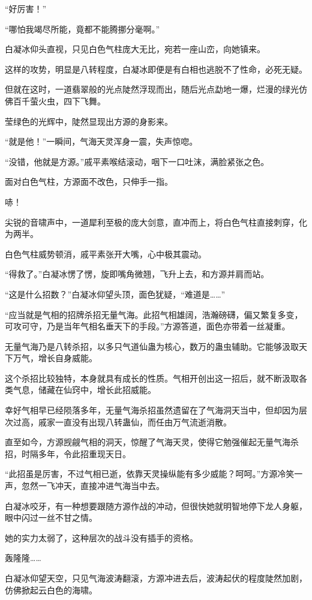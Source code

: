 \begin{this_body}
“好厉害！”

“哪怕我竭尽所能，竟都不能腾挪分毫啊。”

白凝冰仰头直视，只见白色气柱庞大无比，宛若一座山峦，向她镇来。

这样的攻势，明显是八转程度，白凝冰即便是有白相也逃脱不了性命，必死无疑。

但就在这时，一道翡翠般的光点陡然浮现而出，随后光点勐地一爆，烂漫的绿光仿佛百千萤火虫，四下飞舞。

莹绿色的光辉中，陡然显现出方源的身影来。

“就是他！”一瞬间，气海天灵浑身一震，失声惊唿。

“没错，他就是方源。”戚平素喉结滚动，咽下一口吐沫，满脸紧张之色。

面对白色气柱，方源面不改色，只伸手一指。

哧！

尖锐的音啸声中，一道犀利至极的庞大剑意，直冲而上，将白色气柱直接刺穿，化为两半。

白色气柱威势顿消，戚平素张开大嘴，心中极其震动。

“得救了。”白凝冰愣了愣，旋即嘴角微翘，飞升上去，和方源并肩而站。

“这是什么招数？”白凝冰仰望头顶，面色犹疑，“难道是……”

“应当就是气相的招牌杀招无量气海。此招气相雄阔，浩瀚磅礴，偏又繁复多变，可攻可守，乃是当年气相名垂天下的手段。”方源答道，面色亦带着一丝凝重。

无量气海乃是八转杀招，以多只气道仙蛊为核心，数万的蛊虫辅助。它能够汲取天下万气，增长自身威能。

这个杀招比较独特，本身就具有成长的性质。气相开创出这一招后，就不断汲取各类气息，储藏在仙窍中，增长此招威能。

幸好气相早已经陨落多年，无量气海杀招虽然遗留在了气海洞天当中，但却因为层次过高，戚家一直没有出现八转蛊仙，而任由万气流逝消散。

直至如今，方源觊觎气相的洞天，惊醒了气海天灵，使得它勉强催起无量气海杀招，时隔多年，令此招重现天日。

“此招虽是厉害，不过气相已逝，依靠天灵操纵能有多少威能？呵呵。”方源冷笑一声，忽然一飞冲天，直接冲进气海当中去。

白凝冰咬牙，有一种想要跟随方源作战的冲动，但很快她就明智地停下龙人身躯，眼中闪过一丝不甘之情。

她的实力太弱了，这种层次的战斗没有插手的资格。

轰隆隆……

白凝冰仰望天空，只见气海波涛翻滚，方源冲进去后，波涛起伏的程度陡然加剧，仿佛掀起云白色的海啸。


\end{this_body}
